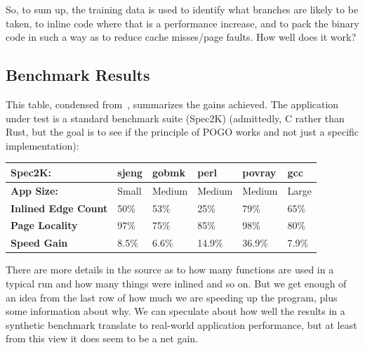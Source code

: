 So, to sum up, the training data is used to identify what branches are likely to be taken, to inline code where that is a performance increase, and to pack the binary code in such a way as to reduce cache misses/page faults. How well does it work?

\subsection*{Benchmark Results}

This table, condensed from~\cite{pogo2}, summarizes the gains achieved. The application under test is a standard benchmark suite (Spec2K) (admittedly, C rather than Rust, but the goal is to see if the principle of POGO works and not just a specific implementation):

\begin{center}
\begin{tabular}{l|l|l|l|l|l}
	\textbf{Spec2K:} & \textbf{sjeng} & \textbf{gobmk} & \textbf{perl} & \textbf{povray} & \textbf{gcc}\\ \hline
	\textbf{App Size:} &  {Small} & {Medium} & {Medium} & {Medium} & {Large} \\ \hline
	\textbf{Inlined Edge Count} & 50\% & 53\% & 25\% & 79\% & 65\% \\ \hline
	\textbf{Page Locality} & 97\% & 75\% & 85\% & 98\% & 80\% \\ \hline
	\textbf{Speed Gain} & 8.5\% & 6.6\% & 14.9\% & 36.9\% & 7.9\% \\ 
\end{tabular}
\end{center}

There are more details in the source as to how many functions are used in a typical run and how many things were inlined and so on. But we get enough of an idea from the last row of how much we are speeding up the program, plus some information about why. We can speculate about how well the results in a synthetic benchmark translate to real-world application performance, but at least from this view it does seem to be a net gain.






